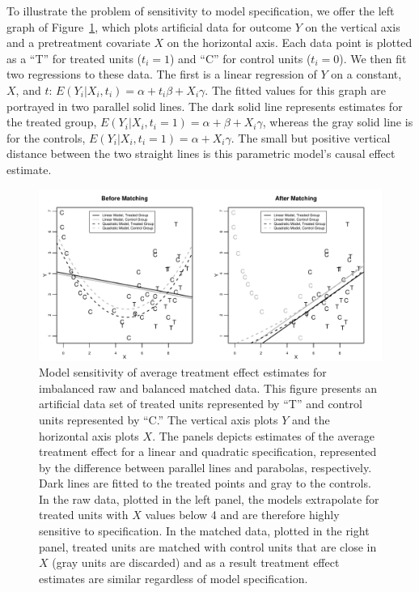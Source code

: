 \documentclass[11pt,titlepage]{article}
\begin{document}
To illustrate the problem of sensitivity to model specification, we
offer the left graph of Figure~\ref{fg:extrap}, which plots artificial
data for outcome $Y$ on the vertical axis and a pretreatment covariate
$X$ on the horizontal axis.  Each data point is plotted as a ``T'' for
treated units ($t_i=1$) and ``C'' for control units ($t_i=0$).  We
then fit two regressions to these data.  The first is a linear
regression of $Y$ on a constant, $X$, and $t$: $E(Y_i|X_i,t_i)=\alpha
+ t_i\beta + X_i\gamma$.  The fitted values for this graph are
portrayed in two parallel solid lines.  The dark solid line represents
estimates for the treated group,
$E(Y_i|X_i,t_i=1)=\alpha+\beta+X_i\gamma$, whereas the gray solid line
is for the controls, $E(Y_i|X_i,t_i=1)=\alpha+X_i\gamma$. The small
but positive vertical distance between the two straight lines is this
parametric model's causal effect estimate.
\begin{figure}[t] 
 \begin{center}
   \includegraphics[width=6in]{figs/olspanel-thick.pdf}
  \end{center}
  \vspace{-0.275in}
  \caption{Model sensitivity of average treatment effect estimates for
    imbalanced raw and balanced matched data.  This figure presents an
    artificial data set of treated units represented by ``T'' and
    control units represented by ``C.'' The vertical axis plots $Y$
    and the horizontal axis plots $X$.  The panels depicts estimates
    of the average treatment effect for a linear and quadratic
    specification, represented by the difference between parallel
    lines and parabolas, respectively.  Dark lines are fitted to the
    treated points and gray to the controls.  In the raw data, plotted
    in the left panel, the models extrapolate for treated units with
    $X$ values below 4 and are therefore highly sensitive to
    specification.  In the matched data, plotted in the right panel,
    treated units are matched with control units that are close in $X$
    (gray units are discarded) and as a result treatment effect
    estimates are similar regardless of model specification.}
  \label{fg:extrap}
\end{figure}
\end{document}
